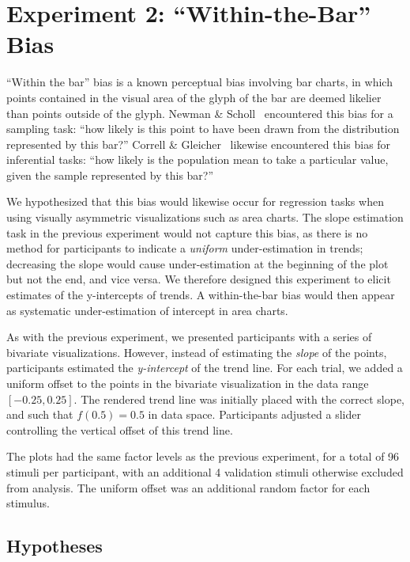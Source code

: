 \documentclass{sigchi}
\begin{document}
\section{Experiment 2: ``Within-the-Bar'' Bias}

\expTwoTypesFig

``Within the bar'' bias is a known perceptual bias involving bar charts, in which points contained in the visual area of the glyph of the bar are deemed likelier than points outside of the glyph. Newman \& Scholl~\cite{newman2012bar} encountered this bias for a sampling task: ``how likely is this point to have been drawn from the distribution represented by this bar?'' Correll \& Gleicher~\cite{correll2014error} likewise encountered this bias for inferential tasks: ``how likely is the population mean to take a particular value, given the sample represented by this bar?''

We hypothesized that this bias would likewise occur for regression tasks when using visually asymmetric visualizations such as area charts. The slope estimation task in the previous experiment would not capture this bias, as there is no method for participants to indicate a \emph{uniform} under-estimation in trends; decreasing the slope would cause under-estimation at the beginning of the plot but not the end, and vice versa. We therefore designed this experiment to elicit estimates of the y-intercepts of trends. A within-the-bar bias would then appear as systematic under-estimation of intercept in area charts.

As with the previous experiment, we presented participants with a series of bivariate visualizations. However, instead of estimating the \emph{slope} of the points, participants estimated the \emph{y-intercept} of the trend line. For each trial, we added a uniform offset to the points in the bivariate visualization in the data range $[-0.25,0.25]$. The rendered trend line was initially placed with the correct slope, and such that $f(0.5)=0.5$ in data space. Participants adjusted a slider controlling the vertical offset of this trend line.

The plots had the same factor levels as the previous experiment, for a total of 96 stimuli per participant, with an additional 4 validation stimuli otherwise excluded from analysis. The uniform offset was an additional random factor for each stimulus.

\subsection{Hypotheses}
\end{document}
